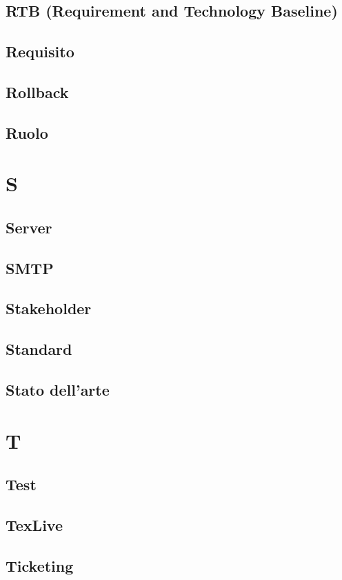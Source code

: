 \documentclass[12pt]{article}
\begin{document}
		\subsection{RTB (Requirement and Technology Baseline)}
		\subsection{Requisito}
		\subsection{Rollback}
		\subsection{Ruolo}
	\clearpage
	\section{S}
		\subsection{Server}
		\subsection{SMTP}
		\subsection{Stakeholder}
		\subsection{Standard}
		\subsection{Stato dell'arte}
	\clearpage
	\section{T}
		\subsection{Test}
		\subsection{TexLive}
		\subsection{Ticketing}
\end{document}
